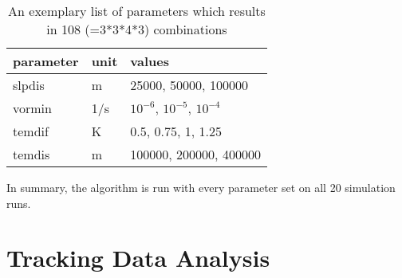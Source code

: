 
\begin{table}[ht]
	\centering
	\begin{tabular}{|l|l|l|}
		\hline
		\textbf{parameter} & \textbf{unit} & \textbf{values}        \\ \hline
		slpdis             & m             & 25000, 50000, 100000   \\
		vormin             & 1/s           & $10^{-6}$, $10^{-5}$, $10^{-4}$       \\
		temdif             & K             & 0.5, 0.75, 1, 1.25       \\
		temdis             & m             & 100000, 200000, 400000 \\ \hline
	\end{tabular}
	\caption{An exemplary list of parameters which results in 108 (=3*3*4*3) combinations }
	\label{tab:param_combos}
\end{table}
In summary, the algorithm is run with every parameter set on all 20
simulation runs.

\section{Tracking Data Analysis}
